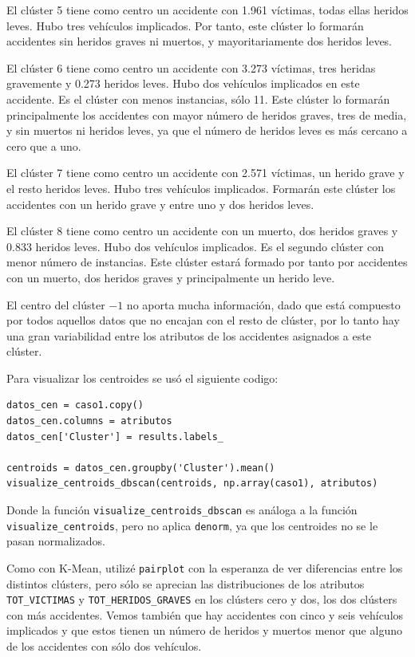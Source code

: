 \documentclass[a4]{article}
\begin{document}
El clúster 5 tiene como centro un accidente con 1.961 víctimas, todas ellas heridos leves. Hubo tres vehículos implicados. Por tanto, este clúster lo formarán accidentes sin heridos graves ni muertos, y mayoritariamente dos heridos leves.

El clúster 6 tiene como centro un accidente con 3.273 víctimas, tres heridas gravemente y 0.273 heridos leves. Hubo dos vehículos implicados en este accidente. Es el clúster con menos instancias, sólo 11. Este clúster lo formarán principalmente los accidentes con mayor número de heridos graves, tres de media, y sin muertos ni heridos leves, ya que el número de heridos leves es más cercano a cero que a uno.

El clúster 7 tiene como centro un accidente con 2.571 víctimas, un herido grave y el resto heridos leves. Hubo tres vehículos implicados. Formarán este clúster los accidentes con un herido grave y entre uno y dos heridos leves.

El clúster 8 tiene como centro un accidente con un muerto, dos heridos graves y 0.833 heridos leves. Hubo dos vehículos implicados. Es el segundo clúster con menor número de instancias. Este clúster estará formado por tanto por accidentes con un muerto, dos heridos graves y principalmente un herido leve.

El centro del clúster $-1$ no aporta mucha información, dado que está compuesto por todos aquellos datos que no encajan con el resto de clúster, por lo tanto hay una gran variabilidad entre los atributos de los accidentes asignados a este clúster.

Para visualizar los centroides se usó el siguiente codigo:

\begin{lstlisting}
datos_cen = caso1.copy()
datos_cen.columns = atributos
datos_cen['Cluster'] = results.labels_

centroids = datos_cen.groupby('Cluster').mean()
visualize_centroids_dbscan(centroids, np.array(caso1), atributos)
\end{lstlisting}

Donde la función \texttt{visualize\_centroids\_dbscan} es análoga a la función \texttt{visualize\_centroids}, pero no aplica \texttt{denorm}, ya que los centroides no se le pasan normalizados.

Como con K-Mean, utilizé \texttt{pairplot} con la esperanza de ver diferencias entre los distintos clústers, pero sólo se aprecian las distribuciones de los atributos \texttt{TOT\_VICTIMAS} y \texttt{TOT\_HERIDOS\_GRAVES} en los clústers cero y dos, los dos clústers con más accidentes. Vemos también que hay accidentes con cinco y seis vehículos implicados y que estos tienen un número de heridos y muertos menor que alguno de los accidentes con sólo dos vehículos.
\end{document}
